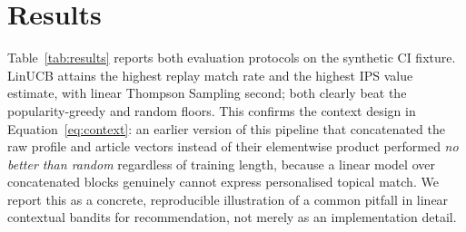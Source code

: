 \section{Results}

Table~\ref{tab:results} reports both evaluation protocols on the synthetic
CI fixture. LinUCB attains the highest replay match rate and the highest
IPS value estimate, with linear Thompson Sampling second; both clearly
beat the popularity-greedy and random floors. This confirms the context
design in Equation~\ref{eq:context}: an earlier version of this pipeline
that concatenated the raw profile and article vectors instead of their
elementwise product performed \emph{no better than random} regardless of
training length, because a linear model over concatenated blocks genuinely
cannot express personalised topical match. We report this as a concrete,
reproducible illustration of a common pitfall in linear contextual bandits
for recommendation, not merely as an implementation detail.
